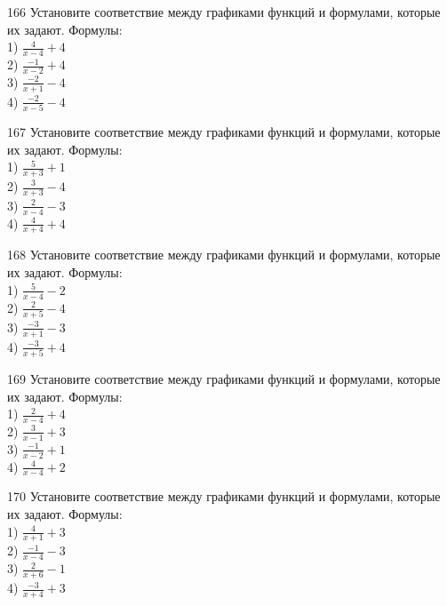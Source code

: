 \documentclass[4apaper]{article}
\begin{document}
\begin{taskBN}{166}
Установите соответствие между графиками функций и формулами, которые их задают. Формулы: \\1) $\frac{4}{x-4}+4$\\2) $\frac{-1}{x-2}+4$\\3) $\frac{-2}{x+1}-4$\\4) $\frac{-2}{x-5}-4$
\end{taskBN}

\begin{taskBN}{167}
Установите соответствие между графиками функций и формулами, которые их задают. Формулы: \\1) $\frac{5}{x+3}+1$\\2) $\frac{3}{x+3}-4$\\3) $\frac{2}{x-4}-3$\\4) $\frac{4}{x+4}+4$
\end{taskBN}

\begin{taskBN}{168}
Установите соответствие между графиками функций и формулами, которые их задают. Формулы: \\1) $\frac{5}{x-4}-2$\\2) $\frac{2}{x+5}-4$\\3) $\frac{-3}{x+1}-3$\\4) $\frac{-3}{x+5}+4$
\end{taskBN}

\begin{taskBN}{169}
Установите соответствие между графиками функций и формулами, которые их задают. Формулы: \\1) $\frac{2}{x-4}+4$\\2) $\frac{3}{x-1}+3$\\3) $\frac{-1}{x-2}+1$\\4) $\frac{4}{x-4}+2$
\end{taskBN}

\begin{taskBN}{170}
Установите соответствие между графиками функций и формулами, которые их задают. Формулы: \\1) $\frac{4}{x+1}+3$\\2) $\frac{-1}{x-4}-3$\\3) $\frac{2}{x+6}-1$\\4) $\frac{-3}{x+4}+3$
\end{taskBN}
\end{document}
